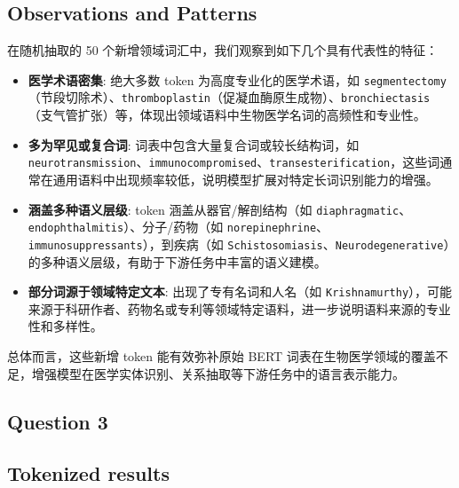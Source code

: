 \documentclass[12pt,letterpaper]{article}
\begin{document}
\subsection*{Observations and Patterns}

在随机抽取的 50 个新增领域词汇中，我们观察到如下几个具有代表性的特征：

\begin{itemize}
	\item \textbf{医学术语密集}: 绝大多数 token 为高度专业化的医学术语，如 \texttt{segmentectomy}（节段切除术）、\texttt{thromboplastin}（促凝血酶原生成物）、\texttt{bronchiectasis}（支气管扩张）等，体现出领域语料中生物医学名词的高频性和专业性。
	
	\item \textbf{多为罕见或复合词}: 词表中包含大量复合词或较长结构词，如 \texttt{neurotransmission}、\texttt{immunocompromised}、\texttt{transesterification}，这些词通常在通用语料中出现频率较低，说明模型扩展对特定长词识别能力的增强。
	
	\item \textbf{涵盖多种语义层级}: token 涵盖从器官/解剖结构（如 \texttt{diaphragmatic}、\texttt{endophthalmitis}）、分子/药物（如 \texttt{norepinephrine}、\texttt{immunosuppressants}），到疾病（如 \texttt{Schistosomiasis}、\texttt{Neurodegenerative}）的多种语义层级，有助于下游任务中丰富的语义建模。
	
	\item \textbf{部分词源于领域特定文本}: 出现了专有名词和人名（如 \texttt{Krishnamurthy}），可能来源于科研作者、药物名或专利等领域特定语料，进一步说明语料来源的专业性和多样性。
\end{itemize}

总体而言，这些新增 token 能有效弥补原始 BERT 词表在生物医学领域的覆盖不足，增强模型在医学实体识别、关系抽取等下游任务中的语言表示能力。

\subsection*{Question 3}

\subsection*{Tokenized results}
\end{document}
